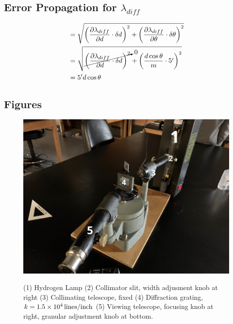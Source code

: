 \documentclass[10pt, twocolumn]{article}
\theoremstyle{definition}
\begin{document}
\subsection{Error Propagation for $\lambda_{diff}$} \label{epropdiff}
\begin{align*}
   & =\sqrt{\left(\frac{\partial \lambda_{diff}}{\partial d}\cdot\delta d\right)^2+\left(\frac{\partial \lambda_{diff}}{\partial \theta}\cdot\delta \theta\right)^2} \\
   & =\sqrt{\cancelto{0}{\left(\frac{\partial \lambda_{diff}}{\partial d}\cdot\delta d\right)^2}+\left(\frac{d\cos\theta}{m}\cdot\qty{5}{\arcminute}\right)^2}       \\
   & =\qty{5}{\arcminute}d\cos\theta                                                                                                                                 \\
\end{align*}
\subsection{Figures}
\begin{figure}[ht]
  \centering%
  \caption{(1) Hydrogen Lamp (2) Collimator slit, width adjusment knob at right (3) Collimating telescope, fixed
    (4) Diffraction grating, $k=\qty{1.5d4}{lines\per inch}$ (5) Viewing telescope, focusing knob at right, granular adjustment knob at bottom.}
  \includegraphics[scale=0.1]{Apparatus.jpg}
  \label{app}
\end{figure}
\end{document}
